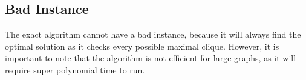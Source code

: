 \subsection{Bad Instance}

The exact algorithm cannot have a bad instance, because it will always find the 
optimal solution as it checks every possible maximal clique. However, it is
important to note that the algorithm is not efficient for large graphs, as it
will require super polynomial time to run.
